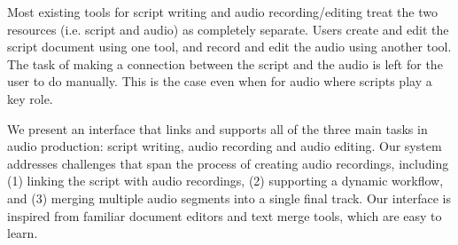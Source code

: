 Most existing tools for script writing and audio recording/editing treat the two resources (i.e. script and audio) as completely separate. Users create and edit the script document using one tool, and record and edit the audio using another tool.
The task of making a connection between the script and the audio is left for the user to do manually. This is the case even
when for audio where scripts play a key role.
  

We present an interface that links and supports all of the three main tasks in audio production: script writing, audio recording and audio editing. Our system addresses challenges that span the process of creating audio recordings, including (1) linking the script  with audio recordings, (2) supporting a dynamic workflow, and (3) merging multiple audio segments into a single final track. Our interface is inspired from familiar document editors and text merge tools, which are easy to learn.
\fi
